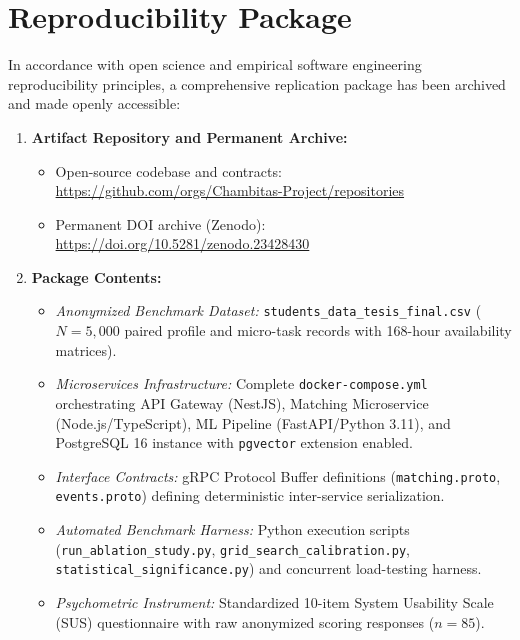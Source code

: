 \documentclass[a4paper,fleqn]{cas-dc}
\begin{document}
\section{Reproducibility Package}
\label{sec:reproducibility}
In accordance with open science and empirical software engineering reproducibility principles, a comprehensive replication package has been archived and made openly accessible:
\begin{enumerate}
    \item \textbf{Artifact Repository and Permanent Archive:}
    \begin{itemize}
        \item Open-source codebase and contracts: \newline \url{https://github.com/orgs/Chambitas-Project/repositories}
        \item Permanent DOI archive (Zenodo): \url{https://doi.org/10.5281/zenodo.23428430}
    \end{itemize}
    \item \textbf{Package Contents:}
    \begin{itemize}
        \item \textit{Anonymized Benchmark Dataset:} \newline \texttt{students\_data\_tesis\_final.csv} ($N = 5,000$ paired profile and micro-task records with 168-hour availability matrices).
        \item \textit{Microservices Infrastructure:} Complete \newline \texttt{docker-compose.yml} orchestrating API Gateway (NestJS), Matching Microservice (Node.js/\allowbreak TypeScript), ML Pipeline (FastAPI/Python 3.11), and PostgreSQL 16 instance with \texttt{pgvector} extension enabled.
        \item \textit{Interface Contracts:} gRPC Protocol Buffer definitions (\texttt{matching.proto}, \texttt{events.proto}) defining deterministic inter-service serialization.
        \item \textit{Automated Benchmark Harness:} Python execution scripts (\texttt{run\_ablation\_study.py}, \newline \texttt{grid\_search\_calibration.py}, \newline \texttt{statistical\_significance.py}) and concurrent load-testing harness.
        \item \textit{Psychometric Instrument:} Standardized 10-item System Usability Scale (SUS) questionnaire with raw anonymized scoring responses ($n = 85$).
    \end{itemize}

\end{enumerate}
\end{document}
